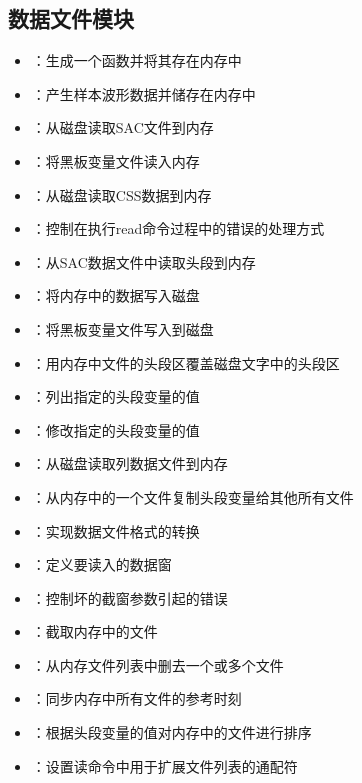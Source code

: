 \subsection*{数据文件模块}
\begin{itemize}
\item {}：生成一个函数并将其存在内存中
\item {}：产生样本波形数据并储存在内存中
\item {}：从磁盘读取SAC文件到内存
\item {}：将黑板变量文件读入内存
\item {}：从磁盘读取CSS数据到内存
\item {}：控制在执行read命令过程中的错误的处理方式
\item {}：从SAC数据文件中读取头段到内存
\item {}：将内存中的数据写入磁盘
\item {}：将黑板变量文件写入到磁盘
\item {}：用内存中文件的头段区覆盖磁盘文字中的头段区
\item {}：列出指定的头段变量的值
\item {}：修改指定的头段变量的值
\item {}：从磁盘读取列数据文件到内存
\item {}：从内存中的一个文件复制头段变量给其他所有文件
\item {}：实现数据文件格式的转换
\item {}：定义要读入的数据窗
\item {}：控制坏的截窗参数引起的错误
\item {}：截取内存中的文件
\item {}：从内存文件列表中删去一个或多个文件
\item {}：同步内存中所有文件的参考时刻
\item {}：根据头段变量的值对内存中的文件进行排序
\item {}：设置读命令中用于扩展文件列表的通配符
\end{itemize}

